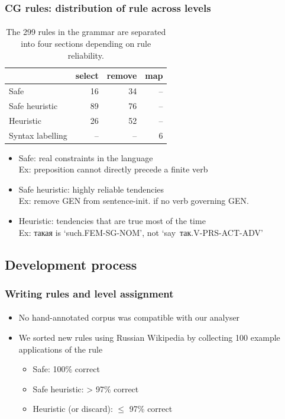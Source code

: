\documentclass{beamer}
\newcommand{\rus}[1]{\foreignlanguage{russian}{#1}}
\begin{document}
\begin{frame}
\frametitle{CG rules: distribution of rule across levels}
\framesubtitle{}
\begin{table}
  \centering
  \begin{tabular}{lrrr}
    \hline
                     & {\sc select} & {\sc remove} & {\sc map} \\
    \hline
    Safe             &   16         &   34         &  -- \\
    Safe heuristic   &   89         &   76         &  -- \\
    Heuristic        &   26         &   52         &  -- \\
    Syntax labelling & --           & --           & 6 \\ 
    \hline
  \end{tabular}
  \caption{The 299 rules in the grammar are separated into four sections depending
      on rule reliability. }
  \label{tab:ruleDist}
\end{table}
\begin{itemize}
	\item Safe: real constraints in the language\\
		{\small Ex: preposition cannot directly precede a finite verb}
		\pause
	\item Safe heuristic: highly reliable tendencies\\ %
		{\small Ex: remove GEN from sentence-init. if no verb governing GEN.}
		\pause
	\item Heuristic: tendencies that are true most of the time\\ %
		{\small Ex: \rus{такая} is `such.FEM-SG-NOM', not `say~\rus{так}.V-PRS-ACT-ADV'}
\end{itemize}
\end{frame}


\subsection{Development process} %

\begin{frame}
\frametitle{Writing rules and level assignment}
\framesubtitle{}
\begin{itemize}
	\item No hand-annotated corpus was compatible with our analyser
	\pause
	\item We sorted new rules using Russian Wikipedia by collecting 100 example applications of the rule
	\pause
	\begin{itemize}
		\item Safe: 100\% correct
		\item Safe heuristic: > 97\% correct
		\item Heuristic (or discard): $\leq$ 97\% correct
	\end{itemize}
\end{itemize}
\end{frame}
\end{document}
